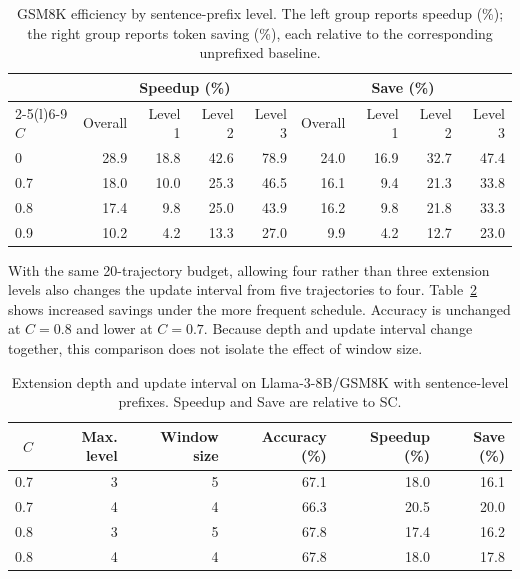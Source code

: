 \begin{table}[!htbp]
\centering\small
\caption{GSM8K efficiency by sentence-prefix level. The left group reports speedup (\%); the right group reports token saving (\%), each relative to the corresponding unprefixed baseline.}
\label{tab:sentence_levels}
\begin{tabular}{@{}lrrrrrrrr@{}}
\toprule
& \multicolumn{4}{c}{Speedup (\%)} & \multicolumn{4}{c}{Save (\%)}\\
\cmidrule(lr){2-5}\cmidrule(l){6-9}
$C$ & Overall & Level 1 & Level 2 & Level 3 & Overall & Level 1 & Level 2 & Level 3\\
\midrule
0 & 28.9 & 18.8 & 42.6 & 78.9 & 24.0 & 16.9 & 32.7 & 47.4\\
0.7 & 18.0 & 10.0 & 25.3 & 46.5 & 16.1 & 9.4 & 21.3 & 33.8\\
0.8 & 17.4 & 9.8 & 25.0 & 43.9 & 16.2 & 9.8 & 21.8 & 33.3\\
0.9 & 10.2 & 4.2 & 13.3 & 27.0 & 9.9 & 4.2 & 12.7 & 23.0\\
\bottomrule
\end{tabular}
\end{table}

With the same 20-trajectory budget, allowing four rather than three extension levels also changes the update interval from five trajectories to four. Table~\ref{tab:sentence_frequency} shows increased savings under the more frequent schedule. Accuracy is unchanged at $C=0.8$ and lower at $C=0.7$. Because depth and update interval change together, this comparison does not isolate the effect of window size.

\begin{table}[!htbp]
\centering\small
\caption{Extension depth and update interval on Llama-3-8B/GSM8K with sentence-level prefixes. Speedup and Save are relative to SC.}
\label{tab:sentence_frequency}
\begin{tabular}{@{}rrrrrr@{}}
\toprule
$C$ & Max. level & Window size & Accuracy (\%) & Speedup (\%) & Save (\%)\\
\midrule
0.7 & 3 & 5 & 67.1 & 18.0 & 16.1\\
0.7 & 4 & 4 & 66.3 & 20.5 & 20.0\\
0.8 & 3 & 5 & 67.8 & 17.4 & 16.2\\
0.8 & 4 & 4 & 67.8 & 18.0 & 17.8\\
\bottomrule
\end{tabular}
\end{table}

